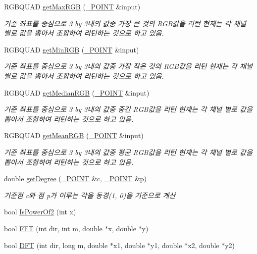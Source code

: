\begin{DoxyCompactItemize}
R\-G\-B\-Q\-U\-A\-D \hyperlink{class_my_image_a67139f04c5ab4bb113874b7f3d10de3d}{get\-Max\-R\-G\-B} (\hyperlink{class___p_o_i_n_t}{\-\_\-\-P\-O\-I\-N\-T} \&input)
\begin{DoxyCompactList}\small\item\em 기준 좌표를 중심으로 3 by 3내의 값중 가장 큰 것의 R\-G\-B값을 리턴 현재는 각 채널 별로 값을 뽑아서 조합하여 리턴하는 것으로 하고 있음. \end{DoxyCompactList}\item 
R\-G\-B\-Q\-U\-A\-D \hyperlink{class_my_image_abf923f02f9ff7fb47dd87e716f0afac9}{get\-Min\-R\-G\-B} (\hyperlink{class___p_o_i_n_t}{\-\_\-\-P\-O\-I\-N\-T} \&input)
\begin{DoxyCompactList}\small\item\em 기준 좌표를 중심으로 3 by 3내의 값중 가장 작은 것의 R\-G\-B값을 리턴 현재는 각 채널 별로 값을 뽑아서 조합하여 리턴하는 것으로 하고 있음. \end{DoxyCompactList}\item 
R\-G\-B\-Q\-U\-A\-D \hyperlink{class_my_image_a2e9eda07e542c7d166a9b51df8f57d04}{get\-Median\-R\-G\-B} (\hyperlink{class___p_o_i_n_t}{\-\_\-\-P\-O\-I\-N\-T} \&input)
\begin{DoxyCompactList}\small\item\em 기준 좌표를 중심으로 3 by 3내의 값중 중간 R\-G\-B값을 리턴 현재는 각 채널 별로 값을 뽑아서 조합하여 리턴하는 것으로 하고 있음. \end{DoxyCompactList}\item 
R\-G\-B\-Q\-U\-A\-D \hyperlink{class_my_image_a454bd6266ccaa80824c25374bb49411b}{get\-Mean\-R\-G\-B} (\hyperlink{class___p_o_i_n_t}{\-\_\-\-P\-O\-I\-N\-T} \&input)
\begin{DoxyCompactList}\small\item\em 기준 좌표를 중심으로 3 by 3내의 값중 평균 R\-G\-B값을 리턴 현재는 각 채널 별로 값을 뽑아서 조합하여 리턴하는 것으로 하고 있음. \end{DoxyCompactList}\item 
double \hyperlink{class_my_image_a2ee075ed79cf8759bcaa5efa2e145ef5}{get\-Degree} (\hyperlink{class___p_o_i_n_t}{\-\_\-\-P\-O\-I\-N\-T} \&c, \hyperlink{class___p_o_i_n_t}{\-\_\-\-P\-O\-I\-N\-T} \&p)
\begin{DoxyCompactList}\small\item\em 기준점 c와 점 p가 이루는 각을 동경(1, 0)을 기준으로 계산 \end{DoxyCompactList}\item 
bool \hyperlink{class_my_image_a49eaf3ff0a985f175d4e0987b4142886}{Is\-Power\-Of2} (int x)
\item 
bool \hyperlink{class_my_image_afbed1dc5cf5664fb0001330b7ab5f236}{F\-F\-T} (int dir, int m, double $\ast$x, double $\ast$y)
\item 
bool \hyperlink{class_my_image_a3b00b867cc5629c01ca64de93bdbb813}{D\-F\-T} (int dir, long m, double $\ast$x1, double $\ast$y1, double $\ast$x2, double $\ast$y2)
\end{DoxyCompactItemize}
